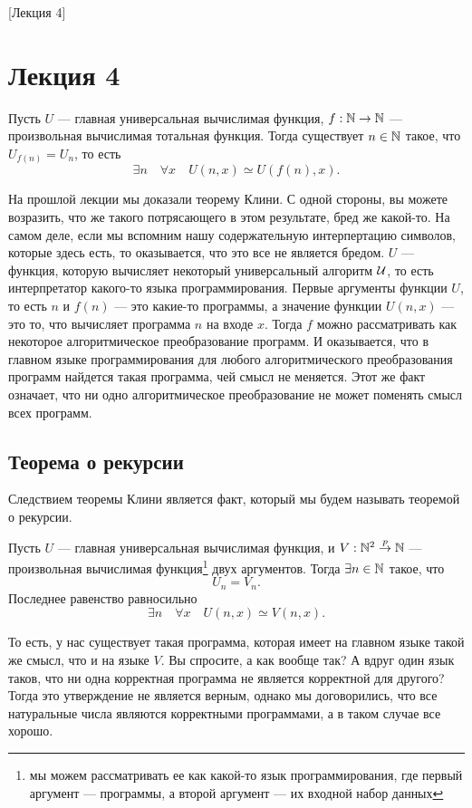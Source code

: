 [Лекция 4]

\section{Лекция 4}

\begin{theorem}
    Пусть $U$ --- главная универсальная вычислимая функция, $f: \mathbb{N} \to \mathbb{N}$ --- произвольная вычислимая тотальная функция.
    Тогда существует $n \in \mathbb{N}$ такое, что $U_{f\left(n\right)} = U_{n}$, то есть
    $$
        \exists n \quad \forall x \quad U\left(n, x\right) \simeq U\left(f\left(n\right), x\right).
    $$
\end{theorem}

На прошлой лекции мы доказали теорему Клини.
С одной стороны, вы можете возразить, что же такого потрясающего в этом результате, бред же какой-то.
На самом деле, если мы вспомним нашу содержательную интерпертацию символов, которые здесь есть, то оказывается, что это все не является бредом.
$U$ --- функция, которую вычисляет некоторый универсальный алгоритм $\mathcal{U}$, то есть интерпретатор какого-то языка программирования.
Первые аргументы функции $U$, то есть $n$ и $f(n)$ --- это какие-то программы, а значение функции $U\left(n, x\right)$ --- это то, что вычисляет программа $n$ на входе $x$.
Тогда $f$ можно рассматривать как некоторое алгоритмическое преобразование программ.
И оказывается, что в главном языке программирования для любого алгоритмического преобразования программ найдется такая программа, чей смысл не меняется.
Этот же факт означает, что ни одно алгоритмическое преобразование не может поменять смысл всех программ.

\subsection{Теорема о рекурсии}

Следствием теоремы Клини является факт, который мы будем называть теоремой о рекурсии.
\begin{corollary}
    Пусть $U$ --- главная универсальная вычислимая функция, и $V: \mathbb{N}^{2} \overset{p}{\to} \mathbb{N}$ --- произвольная вычислимая функция\footnote{мы можем рассматривать ее как какой-то язык программирования, где первый аргумент --- программы, а второй аргумент --- их входной набор данных} двух аргументов.
    Тогда $\exists n \in \mathbb{N}$ такое, что
    $$
        U_{n} = V_{n}.
    $$
    Последнее равенство равносильно
    $$
        \exists n \quad \forall x \quad U\left(n, x\right) \simeq V\left(n, x\right).
    $$
\end{corollary}
То есть, у нас существует такая программа, которая имеет на главном языке такой же смысл, что и на языке $V$.
Вы спросите, а как вообще так?
А вдруг один язык таков, что ни одна корректная программа не является корректной для другого?
Тогда это утверждение не является верным, однако мы договорились, что все натуральные числа являются корректными программами, а в таком случае все хорошо.

